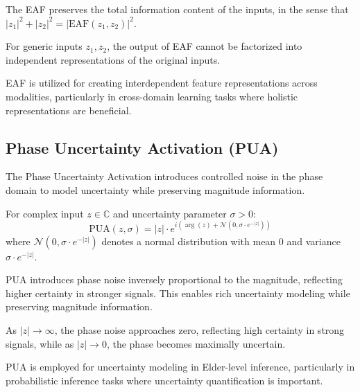 \begin{theorem}
The EAF preserves the total information content of the inputs, in the sense that $|z_1|^2 + |z_2|^2 = |\text{EAF}(z_1,z_2)|^2$.
\end{theorem}

\begin{theorem}
For generic inputs $z_1, z_2$, the output of EAF cannot be factorized into independent representations of the original inputs.
\end{theorem}

EAF is utilized for creating interdependent feature representations across modalities, particularly in cross-domain learning tasks where holistic representations are beneficial.

\subsection{Phase Uncertainty Activation (PUA)}

The Phase Uncertainty Activation introduces controlled noise in the phase domain to model uncertainty while preserving magnitude information.

\begin{definition}
For complex input $z \in \mathbb{C}$ and uncertainty parameter $\sigma > 0$:
\begin{equation}
\text{PUA}(z, \sigma) = |z| \cdot e^{i(\arg(z) + \mathcal{N}(0, \sigma \cdot e^{-|z|}))}
\end{equation}
where $\mathcal{N}(0, \sigma \cdot e^{-|z|})$ denotes a normal distribution with mean 0 and variance $\sigma \cdot e^{-|z|}$.
\end{definition}

PUA introduces phase noise inversely proportional to the magnitude, reflecting higher certainty in stronger signals. This enables rich uncertainty modeling while preserving magnitude information.

\begin{observation}
As $|z| \to \infty$, the phase noise approaches zero, reflecting high certainty in strong signals, while as $|z| \to 0$, the phase becomes maximally uncertain.
\end{observation}

PUA is employed for uncertainty modeling in Elder-level inference, particularly in probabilistic inference tasks where uncertainty quantification is important.

